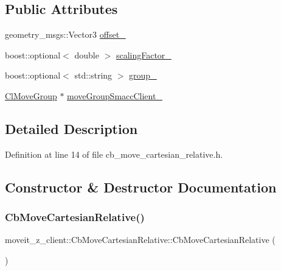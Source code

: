\subsection*{Public Attributes}
\begin{DoxyCompactItemize}
\item 
geometry\+\_\+msgs\+::\+Vector3 \hyperlink{classmoveit__z__client_1_1CbMoveCartesianRelative_aa5316f2f734336722a353a8e9addea95}{offset\+\_\+}
\item 
boost\+::optional$<$ double $>$ \hyperlink{classmoveit__z__client_1_1CbMoveCartesianRelative_a0d483fda685fe6ef7e68240ae5b2140d}{scaling\+Factor\+\_\+}
\item 
boost\+::optional$<$ std\+::string $>$ \hyperlink{classmoveit__z__client_1_1CbMoveCartesianRelative_a45ff6b4ef0f48f75101f97fe1b5ff58d}{group\+\_\+}
\item 
\hyperlink{classmoveit__z__client_1_1ClMoveGroup}{Cl\+Move\+Group} $\ast$ \hyperlink{classmoveit__z__client_1_1CbMoveCartesianRelative_abe1a99706adf6cb61aacb034e0b6a4c9}{move\+Group\+Smacc\+Client\+\_\+}
\end{DoxyCompactItemize}


\subsection{Detailed Description}


Definition at line 14 of file cb\+\_\+move\+\_\+cartesian\+\_\+relative.\+h.



\subsection{Constructor \& Destructor Documentation}
\mbox{\label{classmoveit__z__client_1_1CbMoveCartesianRelative_a5c8cc24c13c1b440cd3ee7cdb26ec7e2}} 
\subsubsection{\texorpdfstring{Cb\+Move\+Cartesian\+Relative()}{CbMoveCartesianRelative()}\hspace{0.1cm}{\footnotesize\ttfamily [1/2]}}
{\footnotesize\ttfamily moveit\+\_\+z\+\_\+client\+::\+Cb\+Move\+Cartesian\+Relative\+::\+Cb\+Move\+Cartesian\+Relative (\begin{DoxyParamCaption}{ }\end{DoxyParamCaption})}



